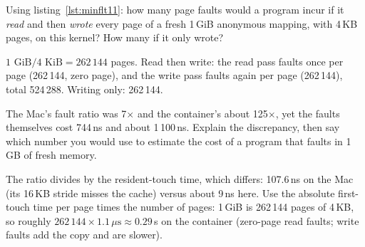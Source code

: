 \begin{exercise}[medium]
Using listing~\ref{lst:minflt11}: how many page faults would a program
incur if it \emph{read} and then \emph{wrote} every page of a fresh 1\,GiB
anonymous mapping, with 4\,KB pages, on this kernel? How many if it only
wrote?
\end{exercise}
\begin{solution}[hint]
$1\text{ GiB}/4\text{ KiB}=262\,144$ pages. Read then write: the read
pass faults once per page (262\,144, zero page), and the write pass
faults again per page (262\,144), total 524\,288. Writing only: 262\,144.
\end{solution}

\begin{exercise}[hard]
The Mac's fault ratio was 7$\times$ and the container's about 125$\times$,
yet the faults themselves cost 744\,ns and about 1\,100\,ns. Explain the
discrepancy, then say which number you would use to estimate the cost of
a program that faults in 1\,GB of fresh memory.
\end{exercise}
\begin{solution}[hint]
The ratio divides by the resident-touch time, which differs: 107.6\,ns on
the Mac (its 16\,KB stride misses the cache) versus about 9\,ns here. Use
the absolute first-touch time per page times the number of pages: 1\,GiB
is 262\,144 pages of 4\,KB, so roughly $262\,144\times1.1\,\mu\text{s}
\approx 0.29$\,s on the container (zero-page read faults; write faults
add the copy and are slower).
\end{solution}
